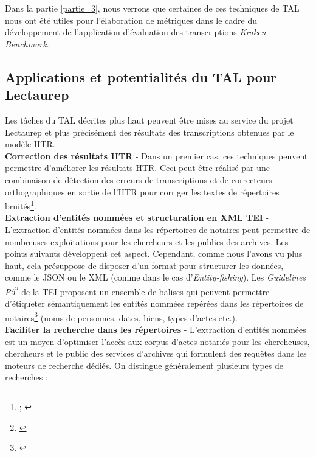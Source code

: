 Dans la partie \ref{partie_3}, nous verrons que certaines de ces techniques de TAL nous ont été utiles pour l'élaboration de métriques dans le cadre du développement de l'application d'évaluation des transcriptions \textit{Kraken-Benchmark}.

\subsection{Applications et potentialités du TAL pour Lectaurep}\label{potentialités_TAL}  

Les tâches du TAL décrites plus haut peuvent être mises au service du projet Lectaurep et plus précisément des résultats des transcriptions obtenues par le modèle HTR.\\

\textbf{Correction des résultats HTR} - Dans un premier cas, ces techniques peuvent permettre d'améliorer les résultats HTR. Ceci peut être réalisé par une combinaison de détection des erreurs de transcriptions et de correcteurs orthographiques en sortie de l'HTR pour corriger les textes de répertoires bruités\footnote{\cite{baranes_vers_2012};  \cite{magallon_detection_2018}}.\\

\textbf{Extraction d'entités nommées et structuration en XML TEI} - L'extraction d'entités nommées dans les répertoires de notaires peut permettre de nombreuses exploitations pour les chercheurs et les publics des archives. Les points suivants développent cet aspect. Cependant, comme nous l'avons vu plus haut, cela présuppose de disposer d'un format pour structurer les données, comme le JSON ou le XML (comme dans le cas d'\textit{Entity-fishing}). Les \textit{Guidelines P5}\footnote{\cite{tei_consortium_p5_2020}} de la TEI proposent un ensemble de balises qui peuvent permettre d'étiqueter sémantiquement les entités nommées repérées dans les répertoires de notaires\footnote{\cite{ruiz_concept-based_2017}} (noms de personnes, dates, biens, types d'actes etc.).\\

\textbf{Faciliter la recherche dans les répertoires} - L'extraction d'entités nommées est un moyen d'optimiser l'accès aux corpus d'actes notariés pour les chercheuses, chercheurs et le public des services d'archives qui formulent des requêtes dans les moteurs de recherche dédiés. On distingue généralement plusieurs types de recherches : 

